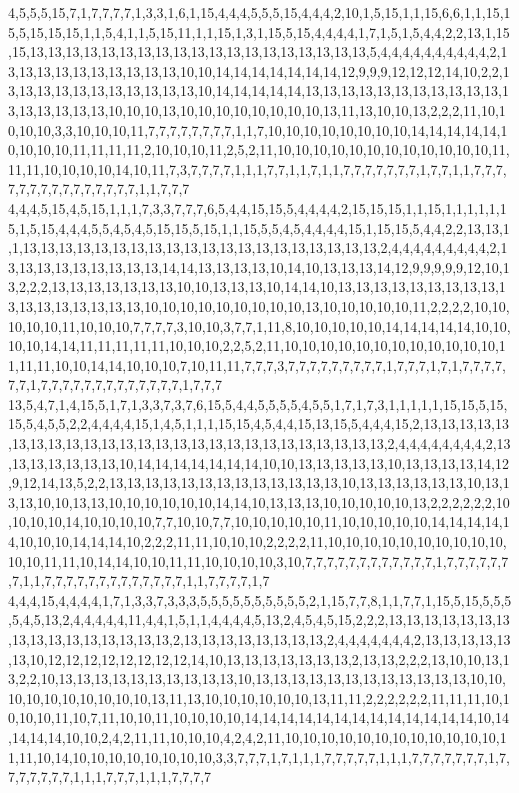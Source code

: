 4,5,5,5,15,7,1,7,7,7,7,1,3,3,1,6,1,15,4,4,4,5,5,5,15,4,4,4,2,10,1,5,15,1,1,15,6,6,1,1,15,15,5,15,15,15,1,1,5,4,1,1,5,15,11,1,1,15,1,3,1,15,5,15,4,4,4,4,1,7,1,5,1,5,4,4,2,2,13,1,15,15,13,13,13,13,13,13,13,13,13,13,13,13,13,13,13,13,13,13,13,5,4,4,4,4,4,4,4,4,4,4,2,13,13,13,13,13,13,13,13,13,13,10,10,14,14,14,14,14,14,14,12,9,9,9,12,12,12,14,10,2,2,13,13,13,13,13,13,13,13,13,13,13,10,14,14,14,14,14,13,13,13,13,13,13,13,13,13,13,13,13,13,13,13,13,13,10,10,10,13,10,10,10,10,10,10,10,10,13,11,13,10,10,13,2,2,2,11,10,10,10,10,3,3,10,10,10,11,7,7,7,7,7,7,7,7,1,1,7,10,10,10,10,10,10,10,10,14,14,14,14,14,10,10,10,10,11,11,11,11,2,10,10,10,11,2,5,2,11,10,10,10,10,10,10,10,10,10,10,10,10,11,11,11,10,10,10,10,14,10,11,7,3,7,7,7,7,1,1,1,7,7,1,1,7,1,1,7,7,7,7,7,7,7,1,7,7,1,1,7,7,7,7,7,7,7,7,7,7,7,7,7,7,7,1,1,7,7,7
4,4,4,5,15,4,5,15,1,1,1,7,3,3,7,7,7,6,5,4,4,15,15,5,4,4,4,4,2,15,15,15,1,1,15,1,1,1,1,1,15,1,5,15,4,4,4,5,5,4,5,4,5,15,15,5,15,1,1,15,5,5,4,5,4,4,4,4,15,1,15,15,5,4,4,2,2,13,13,1,1,13,13,13,13,13,13,13,13,13,13,13,13,13,13,13,13,13,13,13,13,2,4,4,4,4,4,4,4,4,4,2,13,13,13,13,13,13,13,13,13,14,14,13,13,13,13,10,14,10,13,13,13,14,12,9,9,9,9,9,12,10,13,2,2,2,13,13,13,13,13,13,13,10,10,13,13,13,10,14,14,10,13,13,13,13,13,13,13,13,13,13,13,13,13,13,13,13,13,10,10,10,10,10,10,10,10,10,13,10,10,10,10,10,11,2,2,2,2,10,10,10,10,10,11,10,10,10,7,7,7,7,3,10,10,3,7,7,1,11,8,10,10,10,10,10,14,14,14,14,14,10,10,10,10,14,14,11,11,11,11,11,10,10,10,2,2,5,2,11,10,10,10,10,10,10,10,10,10,10,10,10,11,11,11,10,10,14,14,10,10,10,7,10,11,11,7,7,7,3,7,7,7,7,7,7,7,7,7,1,7,7,7,1,7,1,7,7,7,7,7,7,1,7,7,7,7,7,7,7,7,7,7,7,7,7,1,7,7,7
13,5,4,7,1,4,15,5,1,7,1,3,3,7,3,7,6,15,5,4,4,5,5,5,5,4,5,5,1,7,1,7,3,1,1,1,1,1,15,15,5,15,15,5,4,5,5,2,2,4,4,4,4,15,1,4,5,1,1,1,15,15,4,5,4,4,15,13,15,5,4,4,4,15,2,13,13,13,13,13,13,13,13,13,13,13,13,13,13,13,13,13,13,13,13,13,13,13,13,13,13,2,4,4,4,4,4,4,4,4,2,13,13,13,13,13,13,13,10,14,14,14,14,14,14,14,10,10,13,13,13,13,13,10,13,13,13,13,14,12,9,12,14,13,5,2,2,13,13,13,13,13,13,13,13,13,13,13,13,13,10,13,13,13,13,13,13,10,13,13,13,10,10,13,13,10,10,10,10,10,10,14,14,10,13,13,13,10,10,10,10,10,13,2,2,2,2,2,2,10,10,10,10,14,10,10,10,10,7,7,10,10,7,7,10,10,10,10,10,11,10,10,10,10,10,14,14,14,14,14,10,10,10,14,14,14,10,2,2,2,11,11,10,10,10,2,2,2,2,11,10,10,10,10,10,10,10,10,10,10,10,10,11,11,10,14,14,10,10,11,11,10,10,10,10,3,10,7,7,7,7,7,7,7,7,7,7,7,7,1,7,7,7,7,7,7,7,1,1,7,7,7,7,7,7,7,7,7,7,7,7,7,1,1,7,7,7,7,1,7
4,4,4,15,4,4,4,4,1,7,1,3,3,7,3,3,3,5,5,5,5,5,5,5,5,5,5,2,1,15,7,7,8,1,1,7,7,1,15,5,15,5,5,5,5,4,5,13,2,4,4,4,4,4,11,4,4,1,5,1,1,4,4,4,4,5,13,2,4,5,4,5,15,2,2,2,13,13,13,13,13,13,13,13,13,13,13,13,13,13,13,13,2,13,13,13,13,13,13,13,13,2,4,4,4,4,4,4,4,2,13,13,13,13,13,13,10,12,12,12,12,12,12,12,12,14,10,13,13,13,13,13,13,13,2,13,13,2,2,2,13,10,10,13,13,2,2,10,13,13,13,13,13,13,13,13,13,13,10,13,13,13,13,13,13,13,13,13,13,13,13,10,10,10,10,10,10,10,10,10,10,13,11,13,10,10,10,10,10,10,13,11,11,2,2,2,2,2,2,11,11,11,10,10,10,10,11,10,7,11,10,10,11,10,10,10,10,14,14,14,14,14,14,14,14,14,14,14,14,14,10,14,14,14,14,10,10,2,4,2,11,11,10,10,10,4,2,4,2,11,10,10,10,10,10,10,10,10,10,10,10,10,11,11,10,14,10,10,10,10,10,10,10,10,3,3,7,7,7,1,7,1,1,1,7,7,7,7,7,1,1,1,7,7,7,7,7,7,7,1,7,7,7,7,7,7,7,1,1,1,7,7,7,1,1,1,7,7,7,7
